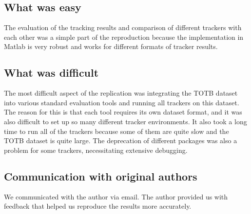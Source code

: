 \subsection*{What was easy}
The evaluation of the tracking results and comparison of different trackers with each other was a simple part of the reproduction because the implementation in Matlab is very robust and works for different formats of tracker results.
\subsection*{What was difficult}
The most difficult aspect of the replication was integrating the TOTB dataset into various standard evaluation tools and running all trackers on this dataset. The reason for this is that each tool requires its own dataset format, and it was also difficult to set up so many different tracker environments. It also took a long time to run all of the trackers because some of them are quite slow and the TOTB dataset is quite large. The deprecation of different packages was also a problem for some trackers, necessitating extensive debugging.
\subsection*{Communication with original authors}
We communicated with the author via email. The author provided us with feedback that helped us reproduce the results more accurately.
